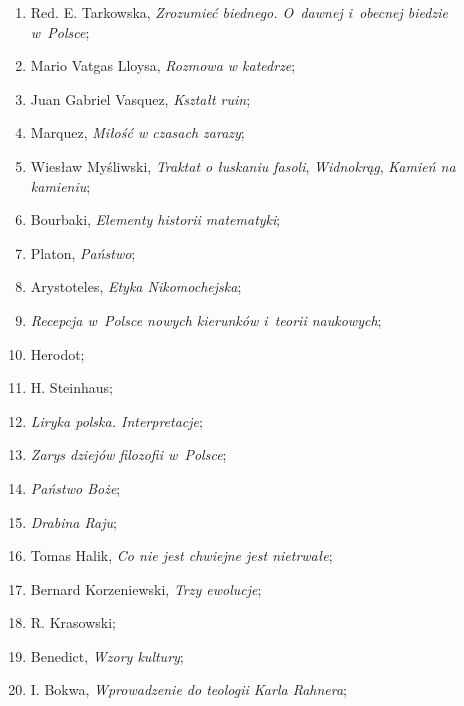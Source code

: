 \documentclass[a4paper,11pt]{article}
\begin{document}
\begin{enumerate}
\item Red. E. Tarkowska, \textit{Zrozumieć biednego. O~dawnej i~obecnej
    biedzie w~Polsce};

\item Mario Vatgas Lloysa, \textit{Rozmowa w katedrze};

\item Juan Gabriel Vasquez, \textit{Kształt ruin};

\item Marquez, \textit{Miłość w czasach zarazy};

\item Wiesław Myśliwski, \textit{Traktat o łuskaniu fasoli},
  \textit{Widnokrąg}, \textit{Kamień na kamieniu};

\item Bourbaki, \textit{Elementy historii matematyki};

\item Platon, \textit{Państwo};

\item Arystoteles, \textit{Etyka Nikomochejska};

\item \textit{Recepcja w~Polsce nowych kierunków i~teorii naukowych};

\item Herodot;

\item H. Steinhaus;

\item \textit{Liryka polska. Interpretacje};

\item \textit{Zarys dziejów filozofii w~Polsce};

\item \textit{Państwo Boże};

\item \textit{Drabina Raju};

\item Tomas Halik, \textit{Co nie jest chwiejne jest nietrwałe};

\item Bernard Korzeniewski, \textit{Trzy ewolucje};

\item R. Krasowski;

\item Benedict, \textit{Wzory kultury};

\item I. Bokwa, \textit{Wprowadzenie do teologii Karla Rahnera};


\end{enumerate}
\end{document}
